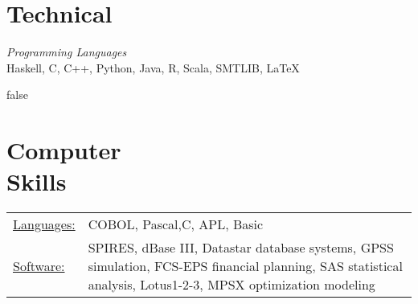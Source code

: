 \documentclass[margin]{res}
\begin{document}
\begin{resume}
\section{Technical}
\textit{Programming Languages} \\
Haskell, C, C++, Python, Java, R, Scala, SMTLIB, \LaTeX{}
 

\if false
\section{Computer \\ Skills}
   \begin{tabular}{l p{3in}}
    \underline{Languages:} & COBOL, Pascal,C, APL, Basic \\

     \underline{Software:} &  SPIRES, dBase III, Datastar database 
                        systems, GPSS simulation, FCS-EPS financial 
                        planning, SAS statistical analysis, 
                        Lotus1-2-3, MPSX optimization modeling 
   \end{tabular}
 \fi

\end{resume} 
\end{document}
